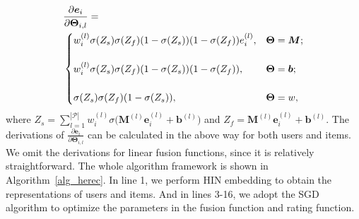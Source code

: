 \begin{align}\label{eq-gradient}
\footnotesize
&\frac{\partial{\bm{e}_{i}}}{\partial{\bm{\Theta}_{i,l}}}=\\
&\begin{cases}
w^{(l)}_i\sigma(Z_s)\sigma(Z_f)(1-\sigma(Z_s))(1-\sigma(Z_f))e^{(l)}_i, &\text{$\bm{\Theta} = \bm{M}$};\nonumber\\
\\
w^{(l)}_i\sigma(Z_s)\sigma(Z_f)(1-\sigma(Z_s))(1-\sigma(Z_f)), &\text{$\bm{\Theta} = \bm{b}$}; \nonumber\\
\\
\sigma(Z_s)\sigma(Z_f)(1-\sigma(Z_s)), &\text{$\bm{\Theta} = w$},
\end{cases}
\end{align}
where $Z_s = \sum_{l=1}^{|\mathcal{P}|} {w^{(l)}_i \sigma\big(\mathbf{M}^{(l)} \bm{e}^{(l)}_i+\bm{b}^{(l)}\big)}$ and $Z_f = \mathbf{M}^{(l)} \bm{e}^{(l)}_i+\bm{b}^{(l)}$. The derivations of $\frac{\partial{\bm{e}_{i}}}{\partial{\bm{\Theta}_{i,l}}}$ can be calculated in the above way for both users and items. We omit the derivations for linear fusion functions, since it is relatively straightforward.
The whole algorithm framework is shown in Algorithm~\ref{alg_herec}.
In line 1, we perform HIN embedding to obtain the representations of users and items. And in lines 3-16, we adopt the SGD algorithm to optimize the parameters in the fusion function and rating function.



